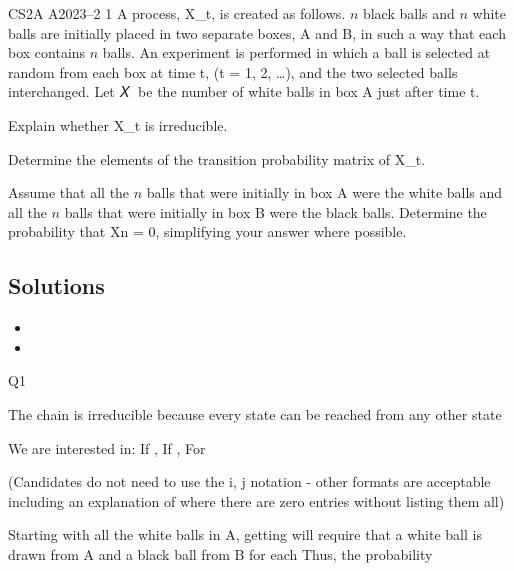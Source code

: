 CS2A A2023–2
1 A process, X_{t}, is created as follows. $n$ black balls and $n$ white balls are initially placed
in two separate boxes, A and B, in such a way that each box contains $n$ balls. An
experiment is performed in which a ball is selected at random from each box at time t,
(t = 1, 2, …), and the two selected balls interchanged. Let 𝑋􀯧 be the number of white
balls in box A just after time t.
\item   Explain whether X_{t} is irreducible. 
\item   Determine the elements of the transition probability matrix of X_{t}. 
\item Assume that all the $n$ balls that were initially in box A were the white balls and all the
$n$ balls that were initially in box B were the black balls.
 Determine the probability that Xn = 0, simplifying your answer where possible.

\subsection*{Solutions}

\begin{itemize}
\item
\item
\end{itemize}

Q1
\item  
The chain is irreducible because every state can be reached from any other state 
\item  
We are interested in:
If , 
If , 
For




(Candidates do not need to use the i, j notation - other formats are acceptable including an explanation of where there are zero entries without listing them all)
\item 
Starting with all the white balls in A, getting will require that a white ball is
drawn from A and a black ball from B for each 
Thus, the probability



